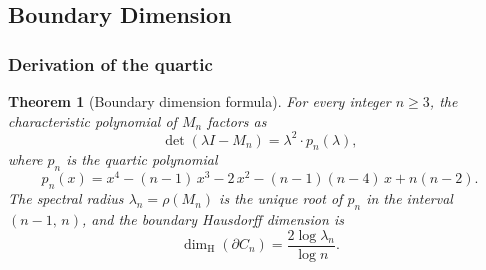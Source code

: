 \documentclass{amsart}
\newtheorem{theorem}{Theorem}[section]
\theoremstyle{definition}
\theoremstyle{remark}
\newcommand{\dH}{\dim_{\mathrm{H}}}
\begin{document}
\subsection{Boundary Dimension}
\label{sec:dim}

\subsubsection{Derivation of the quartic}

\begin{theorem}[Boundary dimension formula]\label{thm:dim}
For every integer $n \ge 3$, the characteristic polynomial of $M_n$
factors as
\begin{equation}\label{eq:charpoly-factor}
  \det(\lambda I - M_n) = \lambda^2 \cdot p_n(\lambda),
\end{equation}
where $p_n$ is the quartic polynomial
\begin{equation}\label{eq:quartic}
  p_n(x) = x^4 - (n{-}1)\,x^3 - 2\,x^2 - (n{-}1)(n{-}4)\,x + n(n{-}2).
\end{equation}
The spectral radius $\lambda_n = \rho(M_n)$ is the unique root of $p_n$
in the interval $(n{-}1,\, n)$, and the boundary Hausdorff dimension is
\begin{equation}\label{eq:dim}
  \dH(\partial C_n) = \frac{2\log\lambda_n}{\log n}.
\end{equation}
\end{theorem}
\end{document}

